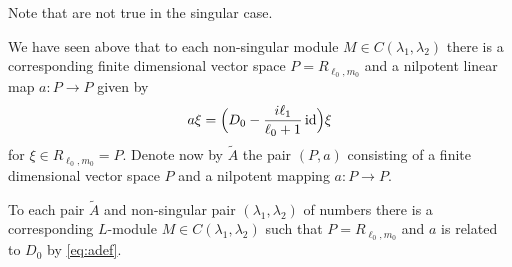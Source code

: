 \begin{remark}
  Note that  are not true in the singular case.
\end{remark}

We have seen above that to each non-singular module $M\in C(\lambda_1,\lambda_2)$ there is a corresponding finite dimensional vector space $P=R_{\ell_0,m_0}$ and a nilpotent linear map $a\colon P\to P$ given by
\begin{align}\label{eq:adef}
  a\xi = \Bigl( D_0 - \dfrac{i\ell_1}{\ell_0+1}\operatorname{id}\Bigr) \xi
\end{align}
for $\xi\in R_{\ell_0,m_0}=P$. Denote now by $\widetilde{A}$ the pair $(P,a)$ consisting of a finite dimensional vector space $P$ and a nilpotent mapping $a\colon P\to P$.

\begin{theorem}\label{thm:objectscor}
  To each pair $\widetilde{A}$ and non-singular pair $(\lambda_1,\lambda_2)$ of numbers there is a corresponding $L$-module $M\in C(\lambda_1,\lambda_2)$ such that $P=R_{\ell_0,m_0}$ and $a$ is related to $D_0$ by \cref{eq:adef}.
\end{theorem}
